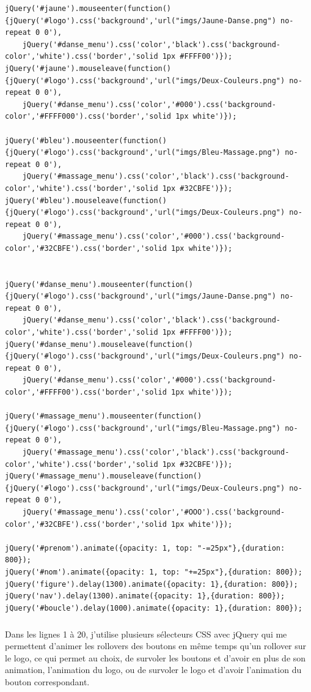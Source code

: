 \documentclass[11pt,a4paper]{report}
\begin{document}
					\begin{lstlisting}
jQuery('#jaune').mouseenter(function() {jQuery('#logo').css('background','url("imgs/Jaune-Danse.png") no-repeat 0 0'),
	jQuery('#danse_menu').css('color','black').css('background-color','white').css('border','solid 1px #FFFF00')});
jQuery('#jaune').mouseleave(function() {jQuery('#logo').css('background','url("imgs/Deux-Couleurs.png") no-repeat 0 0'),
	jQuery('#danse_menu').css('color','#000').css('background-color','#FFFF000').css('border','solid 1px white')});

jQuery('#bleu').mouseenter(function() {jQuery('#logo').css('background','url("imgs/Bleu-Massage.png") no-repeat 0 0'),
	jQuery('#massage_menu').css('color','black').css('background-color','white').css('border','solid 1px #32CBFE')});
jQuery('#bleu').mouseleave(function() {jQuery('#logo').css('background','url("imgs/Deux-Couleurs.png") no-repeat 0 0'),
	jQuery('#massage_menu').css('color','#000').css('background-color','#32CBFE').css('border','solid 1px white')});


jQuery('#danse_menu').mouseenter(function() {jQuery('#logo').css('background','url("imgs/Jaune-Danse.png") no-repeat 0 0'),
	jQuery('#danse_menu').css('color','black').css('background-color','white').css('border','solid 1px #FFFF00')});
jQuery('#danse_menu').mouseleave(function() {jQuery('#logo').css('background','url("imgs/Deux-Couleurs.png") no-repeat 0 0'),
	jQuery('#danse_menu').css('color','#000').css('background-color','#FFFF00').css('border','solid 1px white')});

jQuery('#massage_menu').mouseenter(function() {jQuery('#logo').css('background','url("imgs/Bleu-Massage.png") no-repeat 0 0'),
	jQuery('#massage_menu').css('color','black').css('background-color','white').css('border','solid 1px #32CBFE')});
jQuery('#massage_menu').mouseleave(function() {jQuery('#logo').css('background','url("imgs/Deux-Couleurs.png") no-repeat 0 0'),
	jQuery('#massage_menu').css('color','#OOO').css('background-color','#32CBFE').css('border','solid 1px white')});

jQuery('#prenom').animate({opacity: 1, top: "-=25px"},{duration: 800});
jQuery('#nom').animate({opacity: 1, top: "+=25px"},{duration: 800});
jQuery('figure').delay(1300).animate({opacity: 1},{duration: 800});
jQuery('nav').delay(1300).animate({opacity: 1},{duration: 800});
jQuery('#boucle').delay(1000).animate({opacity: 1},{duration: 800});
					\end{lstlisting}	
				\subparagraph*{}Dans les lignes 1 à 20, j'utilise plusieurs sélecteurs CSS avec jQuery qui me permettent d'animer les rollovers des boutons en même temps qu'un rollover sur le logo, ce qui permet au choix, de survoler les boutons et d'avoir en plus de son animation, l'animation du logo, ou de survoler le logo et d'avoir l'animation du bouton correspondant.\\
\end{document}
